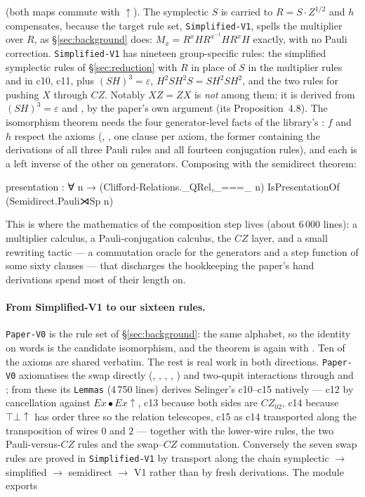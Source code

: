 (both maps commute with $\uparrow$).  The symplectic $S$ is carried to
$R = S \cdot Z^{1/2}$ and $h$ compensates, because the target rule set,
\texttt{Simplified-V1}, spells the multiplier over $R$, as
\S\ref{sec:background} does: $M_x = R^{x}HR^{x^{-1}}HR^{x}H$ exactly, with no Pauli
correction.  \texttt{Simplified-V1} has nineteen group-specific rules:
the simplified symplectic rules of \S\ref{sec:reduction} with $R$ in
place of $S$ in the multiplier rules and in c10, c11, plus
$(SH)^3 = \varepsilon$, $H^2SH^2S = SH^2SH^2$, and the two rules for
pushing $X$ through $CZ$.  Notably $XZ = ZX$ is \emph{not} among them;
it is derived from $(SH)^3 = \varepsilon$ and , by the
paper's own argument (its Proposition~4.8).  The isomorphism theorem
needs the four generator-level facts of the library's
: $f$ and $h$ respect the axioms
(, , one clause per axiom, the
former containing the derivations of all three Pauli rules and all
fourteen conjugation rules), and each is a left inverse of the other on
generators.  Composing with the semidirect theorem:

\begin{agdacode}
presentation : ∀ {n} →
  (Clifford-Relations._QRel,_===_ n) IsPresentationOf (Semidirect.Pauli⋊Sp n)
\end{agdacode}

This is where the mathematics of the composition step lives (about
6\,000 lines): a multiplier calculus, a Pauli-conjugation calculus, the
$CZ$ layer, and a small rewriting tactic --- a commutation oracle for
the generators and a step function of some sixty clauses --- that
discharges the bookkeeping the paper's hand derivations spend most of
their length on.

\paragraph{From Simplified-V1 to our sixteen rules.}
\texttt{Paper-V0} is the rule set of \S\ref{sec:background}: the same
alphabet, so the identity on words is the candidate isomorphism, and
the theorem is again  with .  Ten of
the axioms are shared verbatim.  The rest is real work in both
directions.  \texttt{Paper-V0} axiomatises the swap directly
(, , , ,
) and two-qupit interactions through  and
; from these its \texttt{Lemmas} (4\,750 lines)
derives Selinger's c10--c15 natively --- c12 by cancellation against
$\mathit{Ex} \bullet \mathit{Ex}{\uparrow}$, c13 because both sides are
$CZ_{02}$, c14 because $\top\!\bot{\uparrow}$ has order three so the
relation telescopes, c15 as c14 transported along the transposition of
wires $0$ and $2$ --- together with the lower-wire rules, the two
Pauli-versus-$CZ$ rules and the swap--$CZ$ commutation.  Conversely the
seven swap rules are proved in \texttt{Simplified-V1} by transport along
the chain symplectic $\to$ simplified $\to$ semidirect $\to$ V1 rather
than by fresh derivations.  The module exports

